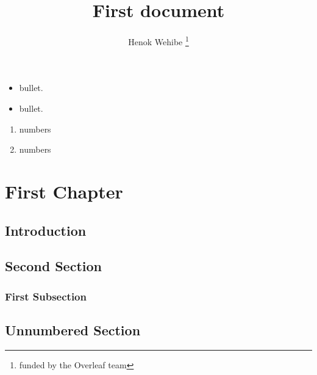 \documentclass{article}
\title{First document}
\author{Henok Wehibe \thanks{funded by the Overleaf team}}
\begin{document}
\maketitle

\begin{itemize}
  \item bullet.
  \item bullet.
\end{itemize}
\begin{enumerate}
  \item numbers
  \item numbers
\end{enumerate}
\chapter{First Chapter}
\section{Introduction}
\section{Second Section}
\subsection{First Subsection}
\section*{Unnumbered Section}
\end{document}
